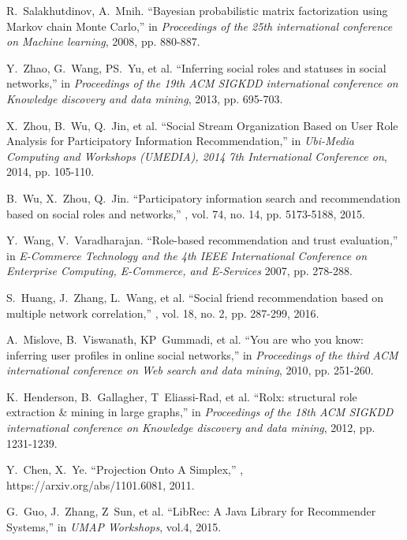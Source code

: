 \documentclass{ieeeaccess}
\begin{document}
\begin{thebibliography}{10}
R.~Salakhutdinov,  A.~Mnih.
\newblock ``Bayesian probabilistic matrix factorization using Markov chain Monte Carlo,''
\newblock in {\em Proceedings of the 25th international conference on Machine learning}, 2008, pp. 880-887.

Y.~Zhao, G.~Wang, PS.~Yu, et al.
\newblock ``Inferring social roles and statuses in social networks,''
\newblock in {\em Proceedings of the 19th ACM SIGKDD international conference on Knowledge discovery and data mining}, 2013, pp. 695-703.

X.~Zhou, B.~Wu, Q.~Jin, et al.
\newblock ``Social Stream Organization Based on User Role Analysis for Participatory Information Recommendation,''
\newblock in {\em Ubi-Media Computing and Workshops (UMEDIA), 2014 7th International Conference on}, 2014, pp. 105-110.

B.~Wu, X.~Zhou, Q.~Jin.
\newblock ``Participatory information search and recommendation based on social roles and networks,''
, vol. 74, no. 14, pp. 5173-5188, 2015.

Y.~Wang, V.~Varadharajan.
\newblock ``Role-based recommendation and trust evaluation,''
\newblock in {\em E-Commerce Technology and the 4th IEEE International Conference on Enterprise Computing, E-Commerce, and E-Services} 2007, pp. 278-288.

S.~Huang, J.~Zhang, L.~Wang, et al.
\newblock ``Social friend recommendation based on multiple network correlation,''
, vol. 18, no. 2, pp. 287-299, 2016.

A.~Mislove, B.~Viswanath, KP~Gummadi, et al.
\newblock ``You are who you know: inferring user profiles in online social networks,''
\newblock in {\em Proceedings of the third ACM international conference on Web search and data mining}, 2010, pp. 251-260.

K.~Henderson, B.~Gallagher, T~Eliassi-Rad, et al.
\newblock ``Rolx: structural role extraction \& mining in large graphs,''
\newblock in {\em Proceedings of the 18th ACM SIGKDD international conference on Knowledge discovery and data mining}, 2012, pp. 1231-1239.

Y.~Chen, X.~Ye.
\newblock ``Projection Onto A Simplex,''
, https://arxiv.org/abs/1101.6081, 2011.

G.~Guo, J.~Zhang, Z~Sun, et al.
\newblock ``LibRec: A Java Library for Recommender Systems,''
\newblock in {\em UMAP Workshops}, vol.4, 2015.

\end{thebibliography}

\EOD
\end{document}
